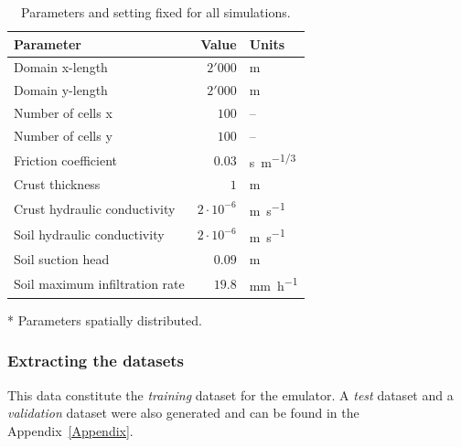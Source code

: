 \begin{table}[h]
  \centering
  \caption{Parameters and setting fixed for all simulations.}
  \label{tab:simulations_parameters}
  \begin{threeparttable}
    \begin{tabular}{lrl}
      \toprule
      \textbf{Parameter} & \textbf{Value} & \textbf{Units} \\
      \midrule
      Domain x-length                          &    $2'000$           & \si{\meter}   \\
      Domain y-length                          &    $2'000$           & \si{\meter}   \\
      Number of cells x                        &    $100$             & --   \\
      Number of cells y                        &    $100$             & --   \\
      Friction coefficient\tnote{*}            &    $0.03$            & \si{s.m^{-1/3}}\\
      Crust thickness\tnote{*}                 &    $1$               & \si{\meter}\\
      Crust hydraulic conductivity\tnote{*}    &    $2\cdot 10^{-6}$  & \si{\meter\per\second}\\
      Soil hydraulic conductivity\tnote{*}     &    $2\cdot 10^{-6}$  & \si{\meter\per\second}\\
      Soil suction head\tnote{*}               &    $0.09$      & \si{\meter}\\
      Soil maximum infiltration rate\tnote{*}  &    $19.8$      & \si{\milli\meter\per\hour}\\
      \bottomrule
    \end{tabular}
    \begin{tablenotes}
      \item[*] Parameters spatially distributed.
    \end{tablenotes}
  \end{threeparttable}
\end{table}

\subsubsection{Extracting the datasets}
This data constitute the \emph{training} dataset for the emulator.
A \emph{test} dataset and a \emph{validation} dataset were also generated and can be found in the Appendix~\ref{Appendix}. 

